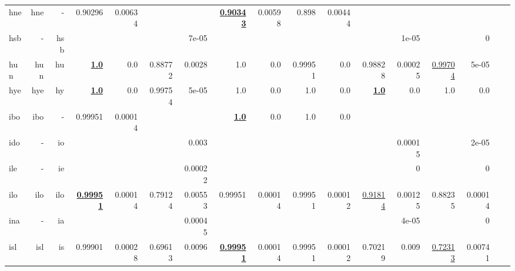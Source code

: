 \documentclass[11pt]{article}
\begin{document}
\begin{table*}[h]
{\begin{tabular}{lrrrrrrrrrrrrrrrr}
hne         & hne         & -         & 0.90296         & 0.00634         &          &          & \textbf{\underline{0.90343}}         & 0.00598         & 0.898         & 0.00444         &          &          &          &          \\
hsb         & -         & hsb         &          &          &          & 7e-05         &          &          &          &          &          & 1e-05         &          & 0         \\
hun         & hun         & hu         & \textbf{\underline{1.0}}         & 0.0         & 0.88772         & 0.0028         & 1.0         & 0.0         & 0.99951         & 0.0         & 0.98828         & 0.00025         & \underline{0.99704}         & 5e-05         \\
hye         & hye         & hy         & \textbf{\underline{1.0}}         & 0.0         & 0.99754         & 5e-05         & 1.0         & 0.0         & 1.0         & 0.0         & \textbf{\underline{1.0}}         & 0.0         & 1.0         & 0.0         \\
ibo         & ibo         & -         & 0.99951         & 0.00014         &          &          & \textbf{\underline{1.0}}         & 0.0         & 1.0         & 0.0         &          &          &          &          \\
ido         & -         & io         &          &          &          & 0.003         &          &          &          &          &          & 0.00015         &          & 2e-05         \\
ile         & -         & ie         &          &          &          & 0.00022         &          &          &          &          &          & 0         &          & 0         \\
ilo         & ilo         & ilo         & \textbf{\underline{0.99951}}         & 0.00014         & 0.79124         & 0.00553         & 0.99951         & 0.00014         & 0.99951         & 0.00012         & \underline{0.91814}         & 0.00125         & 0.88235         & 0.00014         \\
ina         & -         & ia         &          &          &          & 0.00045         &          &          &          &          &          & 4e-05         &          & 0         \\
isl         & isl         & is         & 0.99901         & 0.00028         & 0.69613         & 0.0096         & \textbf{\underline{0.99951}}         & 0.00014         & 0.99951         & 0.00012         & 0.70219         & 0.009         & \underline{0.72313}         & 0.00741         \\

\end{tabular}}
\end{table*}
\end{document}
